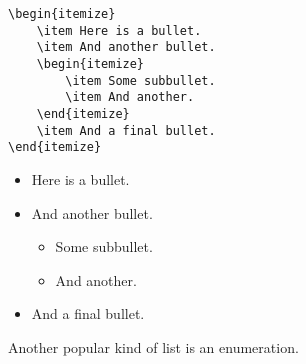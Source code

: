 \documentclass[letterpaper,twoside,10pt]{article}
\begin{document}
\begin{multicols}{2}
{\begin{verbatim}
\begin{itemize}
    \item Here is a bullet.
    \item And another bullet.
    \begin{itemize}
        \item Some subbullet.
        \item And another.
    \end{itemize}
    \item And a final bullet.
\end{itemize}
\end{verbatim}}
\begin{itemize}
	\item Here is a bullet.
	\item And another bullet.
	\begin{itemize}
		\item Some subbullet.
		\item And another.
	\end{itemize}
	\item And a final bullet.
\end{itemize}
\end{multicols}

Another popular kind of list is an enumeration.
\end{document}
